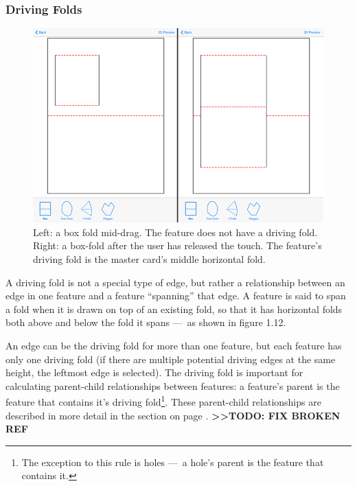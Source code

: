\subsubsection{Driving Folds}\label{driving-folds}

\begin{figure}[htbp]
\centering
\includegraphics{figures/33_UI_Interface_Data_Structures/boxfold_driving_non_driving.png}
\caption{Left: a box fold mid-drag. The feature does not have a driving
fold. Right: a box-fold after the user has released the touch. The
feature's driving fold is the master card's middle horizontal fold.}
\end{figure}

A driving fold is not a special type of edge, but rather a relationship
between an edge in one feature and a feature ``spanning'' that edge. A
feature is said to span a fold when it is drawn on top of an existing
fold, so that it has horizontal folds both above and below the fold it
spans ---~as shown in figure 1.12.

An edge can be the driving fold for more than one feature, but each
feature has only one driving fold (if there are multiple potential
driving edges at the same height, the leftmost edge is selected). The
driving fold is important for calculating parent-child relationships
between features: a feature's parent is the feature that contains it's
driving fold\footnote{The exception to this rule is holes ---~a hole's
  parent is the feature that contains it.}. These parent-child
relationships are described in more detail in the
 section on page \pageref{nested-features}.
\textbf{\textgreater{}\textgreater{}TODO: FIX BROKEN REF}


